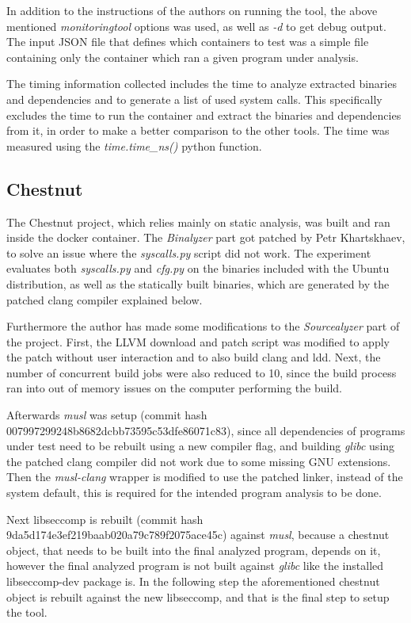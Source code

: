 In addition to the instructions of the authors on running the tool, the above mentioned \textit{monitoringtool} options was used, as well as \textit{-d} to get debug output.
The input JSON file that defines which containers to test was a simple file containing only the container which ran a given program under analysis.

The timing information collected includes the time to analyze extracted binaries and dependencies and to generate a list of used system calls. This specifically excludes the time to run the container and extract the binaries and dependencies from it, in order to make a better comparison to the other tools. The time was measured using the \textit{time.time\_ns()} python function.

\subsection {Chestnut}
The Chestnut \cite{ref_sp_1} project, which relies mainly on static analysis, was built and ran inside the docker container. The \textit{Binalyzer} part got patched by Petr Khartskhaev, to solve an issue where the \textit{syscalls.py} script did not work.
The experiment evaluates both \textit{syscalls.py} and \textit{cfg.py} on the binaries included with the Ubuntu distribution, as well as the statically built binaries, which are generated by the patched clang compiler explained below.

Furthermore the author has made some modifications to the \textit{Sourcealyzer} part of the project. First, the LLVM download and patch script was modified to apply the patch without user interaction and to also build clang and ldd.
Next, the number of concurrent build jobs were also reduced to 10, since the build process ran into out of memory issues on the computer performing the build.

Afterwards \textit{musl} was setup (commit hash 007997299248b8682dcbb73595c53dfe86071c83), since all dependencies of programs under test need to be rebuilt using a new compiler flag, and building \textit{glibc} using the patched clang compiler did not work due to some missing GNU extensions.
Then the \textit{musl-clang} wrapper is modified to use the patched linker, instead of the system default, this is required for the intended program analysis to be done.

Next libseccomp is rebuilt (commit hash 9da5d174e3ef219baab020a79c789f2075ace45c) against \textit{musl}, because a chestnut object, that needs to be built into the final analyzed program, depends on it, however the final analyzed program is not built against \textit{glibc} like the installed libseccomp-dev package is.
In the following step the aforementioned chestnut object is rebuilt against the new libseccomp, and that is the final step to setup the tool.

